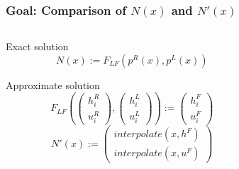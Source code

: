 \documentclass{beamer}
\begin{document}
\begin{frame}
  \frametitle{Goal: Comparison of $N(x)$ and $N'(x)$}
  \begin{columns}
    \begin{column}{.4\textwidth}
      \begin{block}{Exact solution}
        \vspace{-.5cm} %
        \begin{equation*}
          N(x) := F_{LF}(p^R(x),p^L(x))
        \end{equation*}
      \end{block}
      \begin{block}{Approximate solution}
        \vspace{-.5cm} %
        \begin{equation*}
          F_{LF}\left(
            \begin{pmatrix}
              h_i^R \\ u_i^R
            \end{pmatrix},
            \begin{pmatrix}
              h_i^L \\ u_i^L
            \end{pmatrix}
          \right) :=
          \begin{pmatrix}
            h_i^F \\ u_i^F
          \end{pmatrix} %
        \end{equation*}
        \vspace{-.1cm} %
        \begin{equation*}
          N'(x) :=
          \begin{pmatrix}
            interpolate(x,h^F) \\ interpolate(x,u^F)
          \end{pmatrix}
        \end{equation*}        
      \end{block}
    \end{column}
    \begin{column}{.5\textwidth}
      \begin{center}
      \end{center}
    \end{column}
  \end{columns}
  

\end{frame}
\end{document}
